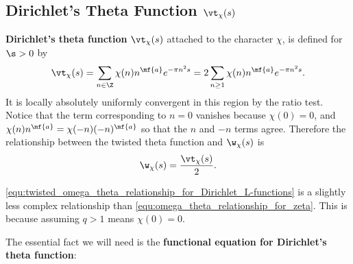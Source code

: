     \subsection*{Dirichlet's Theta Function \texorpdfstring{$\vt_{\chi}(s)$}{\vt_{\chi}(s)}}
      \textbf{Dirichlet's theta function} $\vt_{\chi}(s)$ attached to the character $\chi$, is defined for $\s > 0$ by
      \[
        \vt_{\chi}(s) = \sum_{n \in \Z}\chi(n)n^{\mf{a}}e^{-\pi n^{2}s} = 2\sum_{n \ge 1}\chi(n)n^{\mf{a}}e^{-\pi n^{2}s}.
      \]
      It is locally absolutely uniformly convergent in this region by the ratio test. Notice that the term corresponding to $n = 0$ vanishes because $\chi(0) = 0$, and $\chi(n)n^{\mf{a}} = \chi(-n)(-n)^{\mf{a}}$ so that the $n$ and $-n$ terms agree. Therefore the relationship between the twisted theta function and $\w_{\chi}(s)$ is
      \begin{equation}\label{equ:twisted_omega_theta_relationship_for_Dirichlet_L-functions}
        \w_{\chi}(s) = \frac{\vt_{\chi}(s)}{2}.
      \end{equation}

      \begin{remark}
        \cref{equ:twisted_omega_theta_relationship_for_Dirichlet_L-functions} is a slightly less complex relationship than \cref{equ:omega_theta_relationship_for_zeta}. This is because assuming $q > 1$ means $\chi(0) = 0$.
      \end{remark}

      The essential fact we will need is the \textbf{functional equation for Dirichlet's theta function}:

